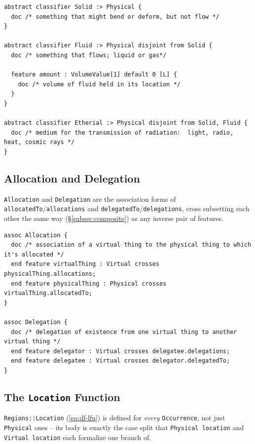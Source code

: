 \begin{lstlisting}
abstract classifier Solid :> Physical {
  doc /* something that might bend or deform, but not flow */
}

abstract classifier Fluid :> Physical disjoint from Solid {
  doc /* something that flows; liquid or gas*/

  feature amount : VolumeValue[1] default 0 [L] {
    doc /* volume of fluid held in its location */
  }
}

abstract classifier Etherial :> Physical disjoint from Solid, Fluid {
  doc /* medium for the transmission of radiation:  light, radio, heat, cosmic rays */
}
\end{lstlisting}

\subsection{Allocation and Delegation}\label{subsec:allocdeleg}

\pn \texttt{Allocation} and \texttt{Delegation} are the association forms of
\texttt{allocatedTo}/\texttt{allocations} and \texttt{delegated\-To}/\texttt{delegations}, cross
subsetting each other the same way (\S\ref{subsec:composite}) as any inverse pair of features.

\begin{lstlisting}
assoc Allocation {
  doc /* association of a virtual thing to the physical thing to which it's allocated */
  end feature virtualThing : Virtual crosses physicalThing.allocations;
  end feature physicalThing : Physical crosses virtualThing.allocatedTo;
}

assoc Delegation {
  doc /* delegation of existence from one virtual thing to another virtual thing */
  end feature delegator : Virtual crosses delegatee.delegations;
  end feature delegatee : Virtual crosses delegator.delegatedTo;
}
\end{lstlisting}

\subsection{The \texttt{Location} Function}\label{subsec:tangibilitylocation}

\pn \texttt{Regions::Location} (\ref{eq:df-lfu}) is defined for \emph{every}
\texttt{Occurrence}, not just \texttt{Physical} ones -- its body is exactly the case split that
\texttt{Physical location} and \texttt{Virtual location} each formalize one branch of.


